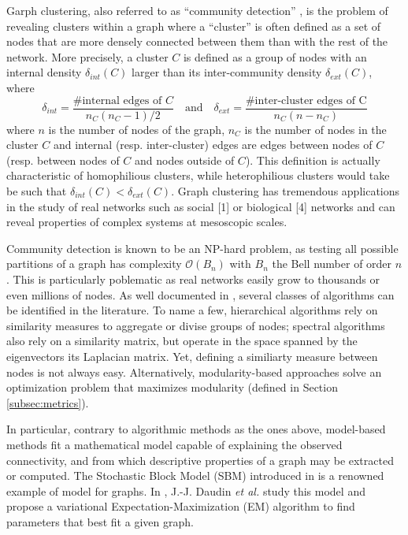 \documentclass[10pt]{article}
\renewcommand{\O}{\mathcal{O}}
\begin{document}
Garph clustering, also referred to as ``community detection'' \cite{fortunato_community_2010}, is the problem of revealing clusters within a graph where a ``cluster'' is often defined as a set of nodes that are more densely connected between them than with the rest of the network.
More precisely, a cluster $C$ is defined as a group of nodes with an internal density $\delta_{int}(C)$ larger than its inter-community density $\delta_{ext}(C)$, where
\begin{equation}
    \delta_{int} = \frac{\text{\# internal edges of }C}{n_C (n_C - 1) / 2} \quad \text{and} \quad \delta_{ext} = \frac{\text{\# inter-cluster edges of C}}{n_C (n - n_C)}
\end{equation}
where $n$ is the number of nodes of the graph, $n_C$ is the number of nodes in the cluster $C$ and internal (resp. inter-cluster) edges are edges between nodes of $C$ (resp. between nodes of $C$ and nodes outside of $C$). This definition is actually characteristic of homophilious clusters, while heterophilious clusters would take be such that $\delta_{int}(C) < \delta_{ext}(C)$.
Graph clustering has tremendous applications in the study of real networks such as
social [1] or biological [4] networks and can reveal properties of complex systems at mesoscopic scales.

Community detection is known to be an NP-hard problem, as testing all possible partitions of a graph has complexity $\O(B_n)$ with $B_n$ the Bell number of order $n$. This is particularly poblematic as real networks easily grow to thousands or even millions of nodes. As well documented in \cite{fortunato_community_2010}, several classes of algorithms can be identified in the literature. To name a few, hierarchical algorithms rely on similarity measures to aggregate or divise groups of nodes; spectral algorithms also rely on a similarity matrix, but operate in the space spanned by the eigenvectors its Laplacian matrix. Yet, defining a similiarty measure between nodes is not always easy. Alternatively, modularity-based approaches solve an optimization problem that maximizes modularity (defined in Section \ref{subsec:metrics}).

In particular, contrary to algorithmic methods as the ones above, model-based methods fit a mathematical model capable of explaining the observed connectivity, and from which descriptive properties of a graph may be extracted or computed. The Stochastic Block Model (SBM) introduced in \cite{snijders_estimation_1997} is a renowned example of model for graphs. In \cite{main_article}, J.-J. Daudin \textit{et al.} study this model and propose a variational Expectation-Maximization (EM) algorithm to find parameters that best fit a given graph.
\end{document}

